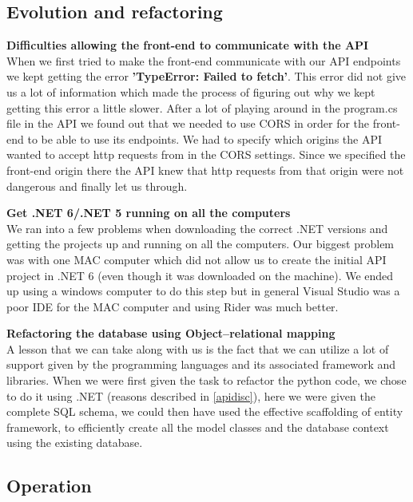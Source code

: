 \documentclass[10pt]{article}
\begin{document}
\subsection{Evolution and refactoring}
\textbf{Difficulties allowing the front-end to communicate with the API}\\ When we first tried to make the front-end communicate with our API endpoints we kept getting the error \textbf{'TypeError: Failed to fetch'}. This error did not give us a lot of information which made the process of figuring out why we kept getting this error a little slower. After a lot of playing around in the program.cs file in the API we found out that we needed to use CORS in order for the front-end to be able to use its endpoints. We had to specify which origins the API wanted to accept http requests from in the CORS settings. Since we specified the front-end origin there the API knew that http requests from that origin were not dangerous and finally let us through. 

\textbf{Get .NET 6/.NET 5 running on all the computers}\\ We ran into a few problems when downloading the correct .NET versions and getting the projects up and running on all the computers. Our biggest problem was with one MAC computer which did not allow us to create the initial API project in .NET 6 (even though it was downloaded on the machine). We ended up using a windows computer to do this step but in general Visual Studio was a poor IDE for the MAC computer and using Rider was much better.


\textbf{Refactoring the database using Object–relational mapping}\\
A lesson that we can take along with us is the fact that we can utilize a lot of support given by the programming languages and its associated framework and libraries. When we were first given the task to refactor the python code, we chose to do it using .NET (reasons described in \ref{apidisc}), here we were given the complete SQL schema, we could then have used the effective scaffolding of entity framework, to efficiently create all the model classes and the database context using the existing database.
\subsection{Operation}
\end{document}
